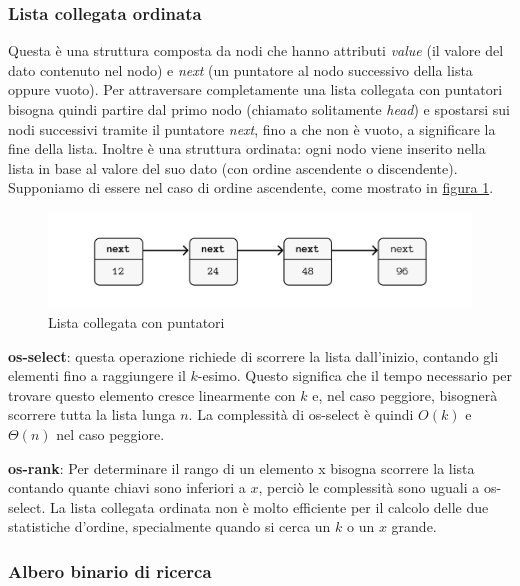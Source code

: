 \documentclass[onecolumn]{article}
\begin{document}
\subsubsection{Lista collegata ordinata}

Questa è una struttura composta da nodi che hanno attributi \textit{value} (il valore del dato contenuto nel nodo) e \textit{next} (un puntatore al nodo successivo della lista oppure vuoto). Per attraversare completamente una lista collegata con puntatori bisogna quindi partire dal primo nodo (chiamato solitamente \textit{head}) e spostarsi sui nodi successivi tramite il puntatore \textit{next}, fino a che non è vuoto, a significare la fine della lista. Inoltre è una struttura ordinata: ogni nodo viene inserito nella lista in base al valore del suo dato (con ordine ascendente o discendente). Supponiamo di essere nel caso di ordine ascendente, come mostrato in \hyperref[fig:lista]{figura 1}.

\begin{figure}
  \includegraphics[width=\linewidth]{lista.png}
  \caption{Lista collegata con puntatori}
  \label{fig:lista}
\end{figure}

\textbf{os-select}: questa operazione richiede di scorrere la lista dall'inizio, contando gli elementi fino a raggiungere il $k$-esimo. Questo significa che il tempo necessario per trovare questo elemento cresce linearmente con $k$ e, nel caso peggiore, bisognerà scorrere tutta la lista lunga $n$. La complessità di os-select è quindi $O(k)$ e $\Theta(n)$ nel caso peggiore. \vspace{0.5em}

\textbf{os-rank}: Per determinare il rango di un elemento x bisogna scorrere la lista contando quante chiavi sono inferiori a $x$, perciò le complessità sono uguali a os-select. La lista collegata ordinata non è molto efficiente per il calcolo delle due statistiche d'ordine, specialmente quando si cerca un $k$ o un $x$ grande. 

\subsubsection{Albero binario di ricerca}
\end{document}
